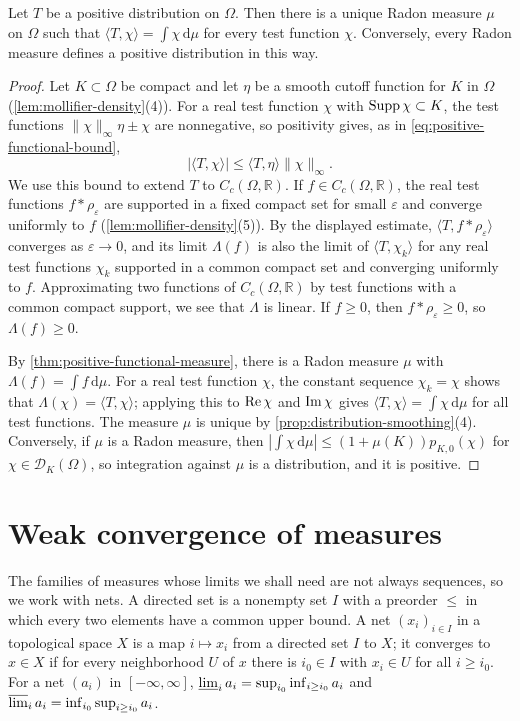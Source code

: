\begin{theorem}\label{thm:positive-distribution-measure}
Let $T$ be a positive distribution on $\Omega$. Then there is a unique Radon measure $\mu$ on $\Omega$ such that $\langle T,\chi\rangle=\int\chi\,\mathrm d\mu$ for every test function $\chi$. Conversely, every Radon measure defines a positive distribution in this way.
\end{theorem}
\begin{proof}
Let $K\subset\Omega$ be compact and let $\eta$ be a smooth cutoff function for $K$ in $\Omega$ (\cref{lem:mollifier-density}(4)). For a real test function $\chi$ with $\operatorname{Supp}\chi\subset K$, the test functions $\|\chi\|_\infty\eta\pm\chi$ are nonnegative, so positivity gives, as in \eqref{eq:positive-functional-bound},
\[
 |\langle T,\chi\rangle|\leq\langle T,\eta\rangle\|\chi\|_\infty.
\]
We use this bound to extend $T$ to $C_c(\Omega,\mathbb R)$. If $f\in C_c(\Omega,\mathbb R)$, the real test functions $f*\rho_\varepsilon$ are supported in a fixed compact set for small $\varepsilon$ and converge uniformly to $f$ (\cref{lem:mollifier-density}(5)). By the displayed estimate, $\langle T,f*\rho_\varepsilon\rangle$ converges as $\varepsilon\to0$, and its limit $\Lambda(f)$ is also the limit of $\langle T,\chi_k\rangle$ for any real test functions $\chi_k$ supported in a common compact set and converging uniformly to $f$. Approximating two functions of $C_c(\Omega,\mathbb R)$ by test functions with a common compact support, we see that $\Lambda$ is linear. If $f\geq0$, then $f*\rho_\varepsilon\geq0$, so $\Lambda(f)\geq0$.

By \cref{thm:positive-functional-measure}, there is a Radon measure $\mu$ with $\Lambda(f)=\int f\,\mathrm d\mu$. For a real test function $\chi$, the constant sequence $\chi_k=\chi$ shows that $\Lambda(\chi)=\langle T,\chi\rangle$; applying this to $\operatorname{Re}\chi$ and $\operatorname{Im}\chi$ gives $\langle T,\chi\rangle=\int\chi\,\mathrm d\mu$ for all test functions. The measure $\mu$ is unique by \cref{prop:distribution-smoothing}(4). Conversely, if $\mu$ is a Radon measure, then $|\int\chi\,\mathrm d\mu|\leq(1+\mu(K))p_{K,0}(\chi)$ for $\chi\in\mathcal D_K(\Omega)$, so integration against $\mu$ is a distribution, and it is positive.
\end{proof}

\section{Weak convergence of measures}
\label{sec:weak-measures}
The families of measures whose limits we shall need are not always sequences, so we work with nets. A directed set is a nonempty set $I$ with a preorder $\leq$ in which every two elements have a common upper bound. A net $(x_i)_{i\in I}$ in a topological space $X$ is a map $i\mapsto x_i$ from a directed set $I$ to $X$; it converges to $x\in X$ if for every neighborhood $U$ of $x$ there is $i_0\in I$ with $x_i\in U$ for all $i\geq i_0$. For a net $(a_i)$ in $[-\infty,\infty]$, $\varliminf_i a_i=\sup_{i_0}\inf_{i\geq i_0}a_i$ and $\varlimsup_i a_i=\inf_{i_0}\sup_{i\geq i_0}a_i$.

